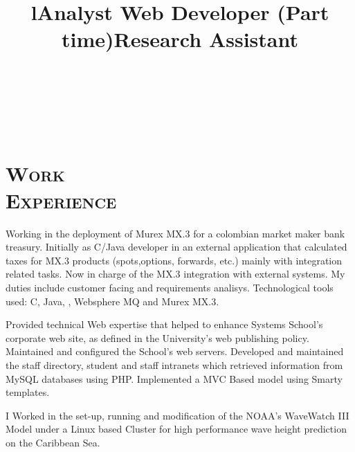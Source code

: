 \begin{resume}
\begin{formatb}
  \title{l}\\
 \\
  \body\\
\end{formatb}

\section{\textsc{Work\\ Experience}}

\title{\textbf{Analyst} }
\begin{position}
Working in the deployment of Murex MX.3 for a colombian market maker
bank treasury. Initially as C/Java developer in an external
application that calculated taxes for MX.3 products (spots,options,
forwards, etc.) mainly with integration related tasks. Now in charge
of the MX.3 integration with external systems. My duties include customer facing and
requirements analisys. Technological tools used:
C, Java, \CSharp,  Websphere MQ and Murex MX.3.
\end{position}


\title{\textbf{Web Developer} (Part time)}
\begin{position}
Provided technical Web expertise that helped to enhance Systems School's corporate web site, 
as defined in the University's web publishing policy. Maintained and
configured the School's web servers. Developed and maintained the
staff directory, student and staff intranets which retrieved
information from MySQL databases using PHP. Implemented a MVC Based
model using Smarty templates.
\end{position}

\title{\textbf{Research Assistant}}
\begin{position}
I Worked in the set-up, running and modification of the NOAA's WaveWatch III Model under a Linux based Cluster
for high performance wave height prediction on the Caribbean Sea.
\end{position}



\end{resume}
